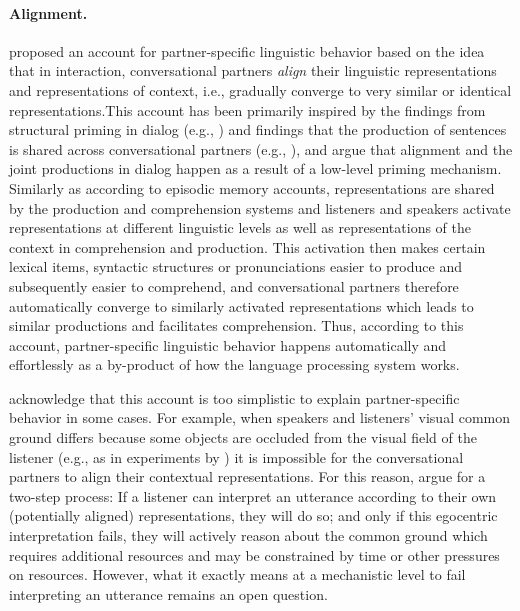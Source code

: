 \paragraph{Alignment.} \cite{PickeringGarrod2004} proposed an account for partner-specific linguistic behavior based on the idea
that in interaction, conversational partners \textit{align} their linguistic representations and representations of context, i.e., gradually converge to very similar or identical 
representations.This account has been primarily inspired by the findings from structural priming in dialog (e.g., \cite{BranniganPickeringCleland2000}) and findings that the production
of sentences is shared across conversational partners (e.g., \cite{GarrodAnderson1987}), and \cite{PickeringGarrod2004} argue that alignment and the joint productions in dialog happen
as a result of a low-level priming mechanism. Similarly as according to episodic memory accounts, representations are shared by the production and comprehension systems and 
listeners and speakers activate representations at different linguistic levels as well as 
representations of the context in comprehension and production. This activation then makes certain lexical items, syntactic structures or pronunciations easier to produce 
and subsequently easier to comprehend, and conversational partners therefore automatically 
converge to similarly activated representations which leads to similar productions and facilitates comprehension. Thus, according to this account, partner-specific linguistic behavior 
happens automatically and effortlessly as a by-product of how the language processing system works.


\cite{PickeringGarrod2004} acknowledge that this account is too simplistic to explain partner-specific behavior in some cases.
For example, when speakers and listeners' visual common ground differs because some objects are occluded from the visual field
of the listener (e.g., as in experiments by \cite{Keysar2000,Heller2008}) it is impossible for the conversational partners to align their
contextual representations. For this reason, \cite{PickeringGarrod2004} argue for a two-step process: If a listener can interpret 
an utterance according to their own (potentially aligned) representations, they will do so; and only if this egocentric interpretation
fails, they will actively reason about the common ground which requires additional resources and may be constrained by time or
other pressures on resources. However, what it exactly means at a mechanistic level to fail interpreting an utterance remains an open
question.

